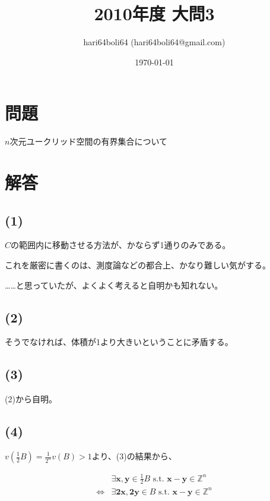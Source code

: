 \documentclass[a4paper, 10pt, dvipdfmx]{jlreq}
\begin{document}
\title{2010年度 大問3}
\author{hari64boli64 (hari64boli64@gmail.com)}
\date{\today}
\maketitle

\section{問題}

$n$次元ユークリッド空間の有界集合について

\section{解答}

\subsection*{(1)}

$C$の範囲内に移動させる方法が、かならず1通りのみである。

これを厳密に書くのは、測度論などの都合上、かなり難しい気がする。

……と思っていたが、よくよく考えると自明かも知れない。

\subsection*{(2)}

そうでなければ、体積が1より大きいということに矛盾する。

\subsection*{(3)}

(2)から自明。

\subsection*{(4)}

$v(\frac{1}{2}B)=\frac{1}{2^n}v(B) > 1$より、(3)の結果から、

\begin{align*}
                  & \exists \bm{x},\bm{y} \in \frac{1}{2}B \text{ s.t. } \bm{x}-\bm{y} \in \mathbb{Z}^n \\
  \Leftrightarrow & \exists \bm{2x},\bm{2y} \in B \text{ s.t. } \bm{x}-\bm{y} \in \mathbb{Z}^n          \\
\end{align*}
\end{document}
